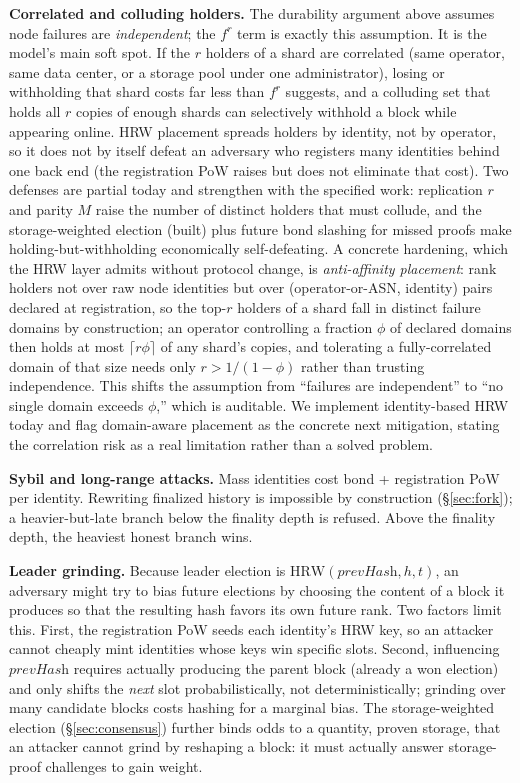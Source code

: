 \textbf{Correlated and colluding holders.} The durability argument above assumes node failures are
\emph{independent}; the $f^r$ term is exactly this assumption. It is the model's main soft spot.
If the $r$ holders of a shard are correlated (same operator, same data center, or a storage pool
under one administrator), losing or withholding that shard costs far less than $f^r$ suggests, and
a colluding set that holds all $r$ copies of enough shards can selectively withhold a block while
appearing online. HRW placement spreads holders by identity, not by operator, so it does not by
itself defeat an adversary who registers many identities behind one back end (the registration PoW
raises but does not eliminate that cost). Two defenses are partial today and strengthen with the
specified work: replication $r$ and parity $M$ raise the number of distinct holders that must
collude, and the storage-weighted election (built) plus future bond slashing for missed proofs make
holding-but-withholding economically self-defeating. A concrete hardening, which the HRW layer
admits without protocol change, is \emph{anti-affinity placement}: rank holders not over raw node
identities but over (operator-or-ASN, identity) pairs declared at registration, so the top-$r$
holders of a shard fall in distinct failure domains by construction; an operator controlling a
fraction $\phi$ of declared domains then holds at most $\lceil r\phi\rceil$ of any shard's copies,
and tolerating a fully-correlated domain of that size needs only $r>1/(1-\phi)$ rather than trusting
independence. This shifts the assumption from ``failures are independent'' to ``no single domain
exceeds $\phi$,'' which is auditable. We implement identity-based HRW today and flag domain-aware
placement as the concrete next mitigation, stating the correlation risk as a real limitation rather
than a solved problem.

\textbf{Sybil and long-range attacks.} Mass identities cost bond + registration PoW per
identity. Rewriting finalized history is impossible by construction (\S\ref{sec:fork}); a
heavier-but-late branch below the finality depth is refused. Above the finality depth, the
heaviest honest branch wins.

\textbf{Leader grinding.} Because leader election is
$\mathrm{HRW}(\textit{prevHash},h,t)$, an adversary might try to bias future elections by choosing
the content of a block it produces so that the resulting hash favors its own future rank. Two
factors limit this. First, the registration PoW seeds each identity's HRW key, so an attacker
cannot cheaply mint identities whose keys win specific slots. Second, influencing $\textit{prevHash}$
requires actually producing the parent block (already a won election) and only shifts the
\emph{next} slot probabilistically, not deterministically; grinding over many candidate blocks costs
hashing for a marginal bias. The storage-weighted election (\S\ref{sec:consensus}) further binds
odds to a quantity, proven storage, that an attacker cannot grind by reshaping a block: it must
actually answer storage-proof challenges to gain weight.

